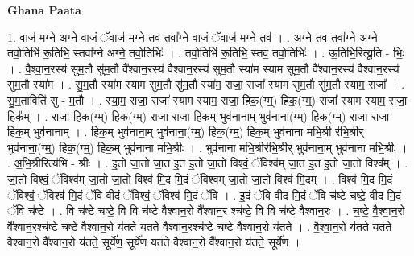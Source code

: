 \documentclass[17pt]{extarticle}
\begin{document}
\textbf{Ghana Paata } \newline

1. वाज॑ मग्ने अग्ने॒ वाजं॒ ॅवाज॑ मग्ने॒ तव॒ तवा᳚ग्ने॒ वाजं॒ ॅवाज॑ मग्ने॒ तव॑ । . अ॒ग्ने॒ तव॒ तवा᳚ग्ने अग्ने॒ तवो॒तिभि॑ रू॒तिभि॒ स्तवा᳚ग्ने अग्ने॒ तवो॒तिभिः॑ । . तवो॒तिभि॑ रू॒तिभि॒ स्तव॒ तवो॒तिभिः॑ । . ऊ॒तिभि॒रित्यू॒ति - भिः॒ । . वै॒श्वा॒न॒रस्य॑ सुम॒तौ सु॑म॒तौ वै᳚श्वान॒रस्य॑ वैश्वान॒रस्य॑ सुम॒तौ स्या॑म स्याम सुम॒तौ वै᳚श्वान॒रस्य॑ वैश्वान॒रस्य॑ सुम॒तौ स्या॑म । . सु॒म॒तौ स्या॑म स्याम सुम॒तौ सु॑म॒तौ स्या॑म॒ राजा॒ राजा᳚ स्याम सुम॒तौ सु॑म॒तौ स्या॑म॒ राजा᳚ । . सु॒म॒ताविति॑ सु - म॒तौ । . स्या॒म॒ राजा॒ राजा᳚ स्याम स्याम॒ राजा॒ हिक॒(ग्म्॒) हिक॒(ग्म्॒) राजा᳚ स्याम स्याम॒ राजा॒ हिक᳚म् । . राजा॒ हिक॒(ग्म्॒) हिक॒(ग्म्॒) राजा॒ राजा॒ हिक॒म् भुव॑नाना॒म् भुव॑नाना॒(ग्म्॒) हिक॒(ग्म्॒) राजा॒ राजा॒ हिक॒म् भुव॑नानाम् । . हिक॒म् भुव॑नाना॒म् भुव॑नाना॒(ग्म्॒) हिक॒(ग्म्॒) हिक॒म् भुव॑नाना मभि॒श्री र॑भि॒श्रीर् भुव॑नाना॒(ग्म्॒) हिक॒(ग्म्॒) हिक॒म् भुव॑नाना मभि॒श्रीः । . भुव॑नाना मभि॒श्रीर॑भि॒श्रीर् भुव॑नाना॒म् भुव॑नाना मभि॒श्रीः । . अ॒भि॒श्रीरित्य॑भि - श्रीः । . इ॒तो जा॒तो जा॒त इ॒त इ॒तो जा॒तो विश्वं॒ ॅविश्व॑म् जा॒त इ॒त इ॒तो जा॒तो विश्व᳚म् । . जा॒तो विश्वं॒ ॅविश्व॑म् जा॒तो जा॒तो विश्व॑ मि॒द मि॒दं ॅविश्व॑म् जा॒तो जा॒तो विश्व॑ मि॒दम् । . विश्व॑ मि॒द मि॒दं ॅविश्वं॒ ॅविश्व॑ मि॒दं ॅवि वीदं ॅविश्वं॒ ॅविश्व॑ मि॒दं ॅवि । . इ॒दं ॅवि वीद मि॒दं ॅवि च॑ष्टे चष्टे॒ वीद मि॒दं ॅवि च॑ष्टे । . वि च॑ष्टे चष्टे॒ वि वि च॑ष्टे वैश्वान॒रो वै᳚श्वान॒र श्च॑ष्टे॒ वि वि च॑ष्टे वैश्वान॒रः । . च॒ष्टे॒ वै॒श्वा॒न॒रो वै᳚श्वान॒रश्च॑ष्टे चष्टे वैश्वान॒रो य॑तते यतते वैश्वान॒रश्च॑ष्टे चष्टे वैश्वान॒रो य॑तते । . वै॒श्वा॒न॒रो य॑तते यतते वैश्वान॒रो वै᳚श्वान॒रो य॑तते॒ सूर्ये॑ण॒ सूर्ये॑ण यतते वैश्वान॒रो वै᳚श्वान॒रो य॑तते॒ सूर्ये॑ण । \newline
\end{document}

